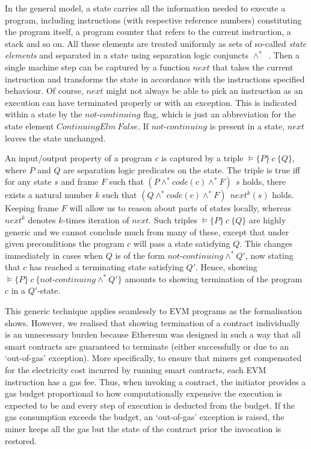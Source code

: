 \documentclass[sigplan,10pt,review]{acmart}\settopmatter{printfolios=true,printccs=false,printacmref=false}
\newcommand{\sconj}{\wedge^*}
\newcommand{\pvalid}[3]{\models\{#1\}\:#2\:\{#3\}}
\newcommand{\xnext}{\mathit{next}}
\newcommand{\code}[1]{\mathit{code}(#1)}
\newcommand{\ncont}{\mathit{not\mbox{-}continuing}}
\begin{document}
In the general model, a state carries all the information needed to execute a program, including
instructions (with respective reference numbers) constituting the program itself, a program counter that
refers to the current instruction, a stack and so on. All these elements are treated uniformly 
as sets of so-called \emph{state elements}
and separated in a state using separation logic conjuncts $\sconj$~\cite{Reynolds_02}.  
Then a single machine step can be captured by a function $\xnext$ that 
takes the current instruction and transforms the state in accordance with the instructions
specified behaviour. Of course, $\xnext$ might not always be able to pick an instruction
as an execution can have terminated properly or with an exception. This is indicated within a state
by the $\ncont$ flag, which is just an abbreviation for the state element 
$\mathit{ContinuingElm}\:False$. If $\ncont$ is present in a state, $\xnext$
leaves the state unchanged.   
   
An input/output property of a program $c$ is captured by a triple
$\pvalid{P}{c}{Q}$, where $P$ and $Q$ are separation logic predicates on the state.
The triple is true iff for any state $s$ and frame $F$ such that
$(P \sconj \code{c} \sconj F)\:\ s$ holds, there exists a natural number $k$ such that 
$(Q \sconj \code{c} \sconj F)\:\ \xnext^k(s)$ holds. 
Keeping frame $F$ will allow us to reason about parts of states locally, %
whereas $\xnext^k$ denotes $k$-times iteration of $\xnext$.
Such triples $\pvalid{P}{c}{Q}$ are highly generic and we cannot conclude much from many of these, except that
under given preconditions the program $c$ will pass a state satisfying $Q$. This changes immediately in cases when $Q$ is of
the form $\ncont \sconj Q'$, now stating that $c$ has reached a terminating state satisfying $Q'$.
Hence, showing $\pvalid{P}{c}{\ncont \sconj Q'}$ amounts to showing termination of the program $c$ in
a $Q'$-state.

This generic technique applies seamlessly to EVM programs as
the formalisation~\cite{Yoichi} shows.
However, we realised that showing termination of a contract individually is an unnecessary burden because
Ethereum was designed in such a way that all smart contracts
are guaranteed to terminate (either successfully or due to an `out-of-gas' exception).
More specifically, to ensure that miners get compensated for the electricity cost
incurred by running smart contracts, each EVM instruction
has a gas fee.
Thus, when invoking a contract, the initiator provides a gas budget
proportional to how computationally expensive the execution is expected
to be and every step of execution is deducted from the budget.
If the gas consumption exceeds the budget, an `out-of-gas' exception is
raised,
the miner keeps all the gas but
the state of the contract prior the
invocation is restored.
\end{document}
